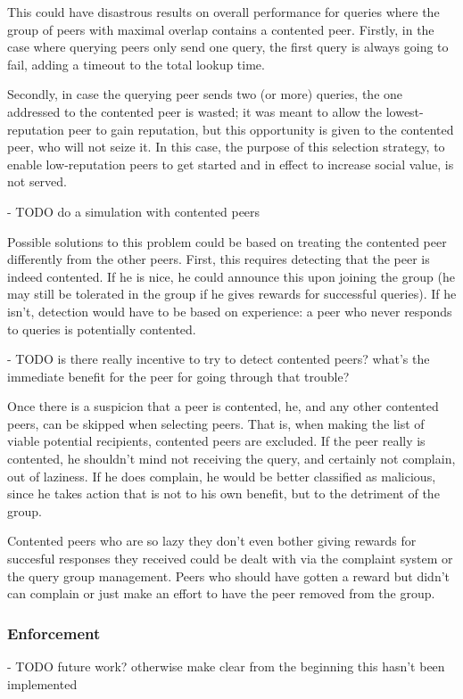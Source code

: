 This could have disastrous results on overall performance for queries where the
group of peers with maximal overlap contains a contented peer. Firstly, in the
case where querying peers only send one query, the first query is always going
to fail, adding a timeout to the total lookup time.

Secondly, in case the querying peer sends two (or more) queries, the one
addressed to the contented peer is wasted; it was meant to allow the
lowest-reputation peer to gain reputation, but this opportunity is given to the
contented peer, who will not seize it. In this case, the purpose of this
selection strategy, to enable low-reputation peers to get started and in effect
to increase social value, is not served.

- TODO do a simulation with contented peers

Possible solutions to this problem could be based on treating the contented peer
differently from the other peers. First, this requires detecting that the peer
is indeed contented. If he is nice, he could announce this upon joining the
group (he may still be tolerated in the group if he gives rewards for successful
queries). If he isn't, detection would have to be based on experience: a peer
who never responds to queries is potentially contented.

- TODO is there really incentive to try to detect contented peers? what's the
  immediate benefit for the peer for going through that trouble?

Once there is a suspicion that a peer is contented, he, and any other contented
peers, can be skipped when selecting peers. That is, when making the list of
viable potential recipients, contented peers are excluded. If the peer really is
contented, he shouldn't mind not receiving the query, and certainly not
complain, out of laziness. If he does complain, he would be better classified as
malicious, since he takes action that is not to his own benefit, but to the
detriment of the group.

Contented peers who are so lazy they don't even bother giving rewards for
succesful responses they received could be dealt with via the complaint system
or the query group management. Peers who should have gotten a reward but didn't
can complain or just make an effort to have the peer removed from the group.

\subsubsection{Enforcement}
\label{sec:selection_overlap_rep_sorted_enforcement}
- TODO future work? otherwise make clear from the beginning this hasn't been
  implemented

